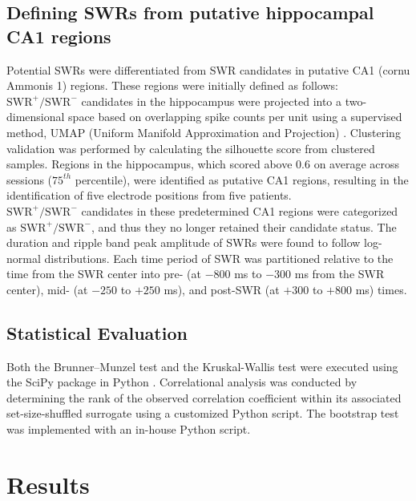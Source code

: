 \documentclass[preprint,review,12pt]{elsarticle}%
\providecommand{\DIFaddtex}[1]{{\protect\color{blue}\uwave{#1}}} %
\providecommand{\DIFaddbegin}{} %
\providecommand{\DIFaddend}{} %
\providecommand{\DIFadd}[1]{\texorpdfstring{\DIFaddtex{#1}}{#1}} %
\newcommand{\DIFaddincludegraphics}[2][]{{\color{blue}\fbox{\DIFOincludegraphics[#1]{#2}}}} %
\DeclareRobustCommand{\DIFaddbegin}{\DIFOaddbegin \let\includegraphics\DIFaddincludegraphics} %
\DeclareRobustCommand{\DIFaddend}{\DIFOaddend \let\includegraphics\DIFOincludegraphics} %
\begin{document}
\subsection{Defining SWRs from putative hippocampal CA1 regions \DIFaddbegin \DIFadd{using UMAP clustering}\DIFaddend }
Potential SWRs were differentiated from SWR candidates in putative CA1 (cornu Ammonis 1) regions. These regions were initially defined as follows: $\textrm{SWR}^+/\textrm{SWR}^-$ candidates in the hippocampus were projected into a two-dimensional space based on overlapping spike counts per unit using a supervised method, UMAP (Uniform Manifold Approximation and Projection) \cite{mcinnes_umap_2018}. Clustering validation was performed by calculating the silhouette score \cite{rousseeuw_silhouettes_1987} from clustered samples. Regions in the hippocampus, which scored above 0.6 on average across sessions ($75^{th}$ percentile), were identified as putative CA1 regions, resulting in the identification of five electrode positions from five patients.
\\
\indent
$\textrm{SWR}^+/\textrm{SWR}^-$ candidates in these predetermined CA1 regions were categorized as $\textrm{SWR}^+/\textrm{SWR}^-$, and thus they no longer retained their candidate status. The duration and ripple band peak amplitude of SWRs were found to follow log-normal distributions. Each time period of SWR was partitioned relative to the time from the SWR center into pre- (at $-800$ ms to $-300$ ms from the SWR center), mid- (at $-250$ to $+250$ ms), and post-SWR (at $+300$ to $+800$ ms) times.
\\
\indent
\subsection{Statistical Evaluation}
Both the Brunner--Munzel test and the Kruskal-Wallis test were executed using the SciPy package in Python \cite{virtanen_scipy_2020}. Correlational analysis was conducted by determining the rank of the observed correlation coefficient within its associated set-size-shuffled surrogate using a customized Python script. The bootstrap test was implemented with an in-house Python script.
\label{sec:methods}
\section{Results}
\end{document}
